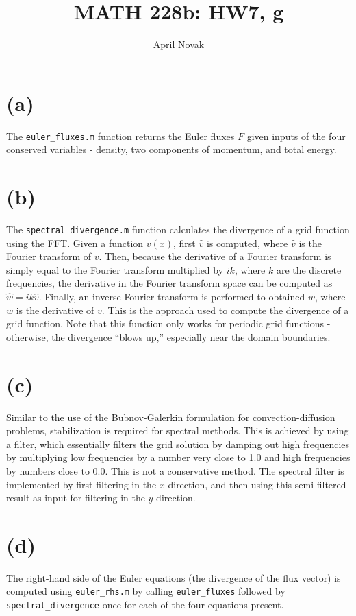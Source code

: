 \documentclass[10pt]{article}
\begin{document}
\title{MATH 228b: HW7, g}
\author{April Novak}

\maketitle

\section{(a)}
The {\tt euler\_fluxes.m} function returns the Euler fluxes \(F\) given inputs of the four conserved variables - density, two components of momentum, and total energy.

\section{(b)}
The {\tt spectral\_divergence.m} function calculates the divergence of a grid function using the FFT. Given a function \(v(x)\), first \(\hat{v}\) is computed, where \(\hat{v}\) is the Fourier transform of \(v\). Then, because the derivative of a Fourier transform is simply equal to the Fourier transform multiplied by \(ik\), where \(k\) are the discrete frequencies, the derivative in the Fourier transform space can be computed as \(\hat{w}=ik\hat{v}\). Finally, an inverse Fourier transform is performed to obtained \(w\), where \(w\) is the derivative of \(v\). This is the approach used to compute the divergence of a grid function. Note that this function only works for periodic grid functions - otherwise, the divergence ``blows up,'' especially near the domain boundaries.

\section{(c)}
Similar to the use of the Bubnov-Galerkin formulation for convection-diffusion problems, stabilization is required for spectral methods. This is achieved by using a filter, which essentially filters the grid solution by damping out high frequencies by multiplying low frequencies by a number very close to 1.0 and high frequencies by numbers close to 0.0. This is not a conservative method. The spectral filter is implemented by first filtering in the \(x\) direction, and then using this semi-filtered result as input for filtering in the \(y\) direction.

\section{(d)}
The right-hand side of the Euler equations (the divergence of the flux vector) is computed using {\tt euler\_rhs.m} by calling {\tt euler\_fluxes} followed by {\tt spectral\_divergence} once for each of the four equations present.
\end{document}

